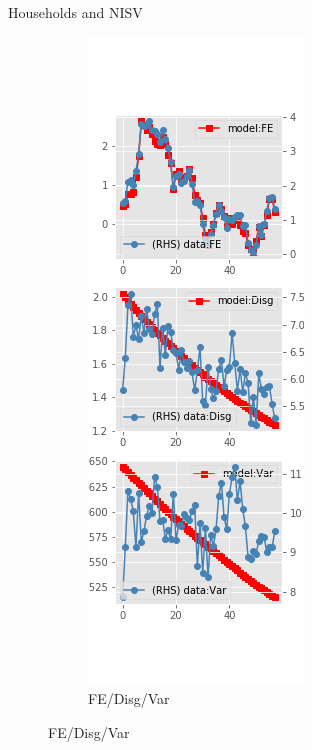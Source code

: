 \documentclass{beamer}
\begin{document}
\begin{frame}{Households and NISV}
\begin{figure}[ht]
\begin{subfigure}[b]{0.2\textwidth}
		\end{subfigure}
		\hfill
		\begin{subfigure}[b]{0.2\textwidth}
			\caption{FE/Disg/Var}
			\includegraphics[width=\textwidth, height = 0.8\textheight]{figuresDraft/sce_ni_est_sv_diag3.png}
		\end{subfigure}
	\end{figure}
\end{frame}
\end{document}
